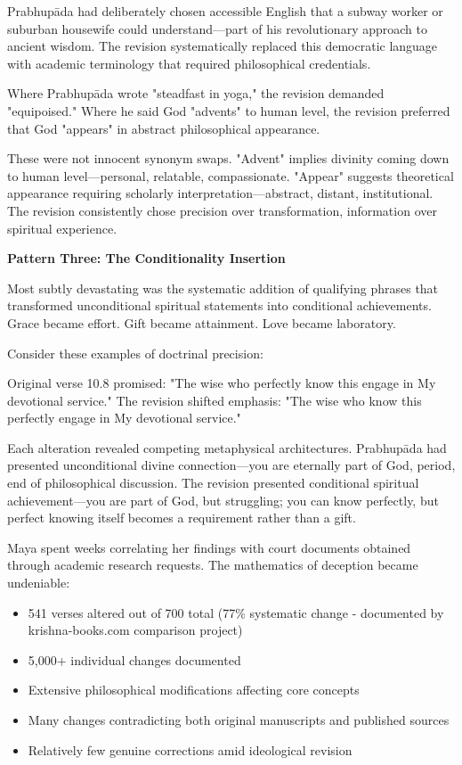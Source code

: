 \documentclass[12pt,twoside]{book}
\begin{document}
Prabhupāda had deliberately chosen accessible English that a subway worker or suburban housewife could understand—part of his revolutionary approach to ancient wisdom. The revision systematically replaced this democratic language with academic terminology that required philosophical credentials.

Where Prabhupāda wrote "steadfast in yoga," the revision demanded "equipoised." Where he said God "advents" to human level, the revision preferred that God "appears" in abstract philosophical appearance.

These were not innocent synonym swaps. "Advent" implies divinity coming down to human level—personal, relatable, compassionate. "Appear" suggests theoretical appearance requiring scholarly interpretation—abstract, distant, institutional. The revision consistently chose precision over transformation, information over spiritual experience.

\textbf{\textbf{Pattern Three: The Conditionality Insertion}}

Most subtly devastating was the systematic addition of qualifying phrases that transformed unconditional spiritual statements into conditional achievements. Grace became effort. Gift became attainment. Love became laboratory.

Consider these examples of doctrinal precision:

Original verse 10.8 promised: "The wise who perfectly know this engage in My devotional service."  
The revision shifted emphasis: "The wise who know this perfectly engage in My devotional service."

Each alteration revealed competing metaphysical architectures. Prabhupāda had presented unconditional divine connection—you are eternally part of God, period, end of philosophical discussion. The revision presented conditional spiritual achievement—you are part of God, but struggling; you can know perfectly, but perfect knowing itself becomes a requirement rather than a gift.

Maya spent weeks correlating her findings with court documents obtained through academic research requests. The mathematics of deception became undeniable:

\begin{itemize}
\item 541 verses altered out of 700 total (77\% systematic change - documented by krishna-books.com comparison project)
\item 5,000+ individual changes documented
\item Extensive philosophical modifications affecting core concepts
\item Many changes contradicting both original manuscripts and published sources
\item Relatively few genuine corrections amid ideological revision
\end{itemize}
\end{document}
